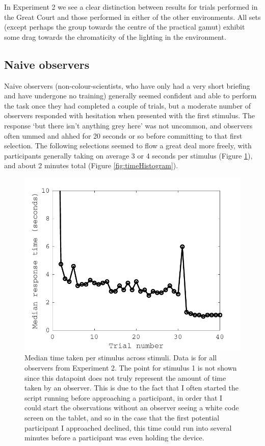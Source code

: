 In Experiment 2 we see a clear distinction between results for trials performed in the Great Court and those performed in either of the other environments. All sets (except perhaps the group towards the centre of the practical gamut) exhibit some drag towards the chromaticity of the lighting in the environment.

\subsection{Naive observers} \label{sec:naive}

Naive observers (non-colour-scientists, who have only had a very short briefing and have undergone no training) generally seemed confident and able to perform the task once they had completed a couple of trials, but a moderate number of observers responded with hesitation when presented with the first stimulus. The response `but there isn't anything grey here' was not uncommon, and observers often ummed and ahhed for 20 seconds or so before committing to that first selection. The following selections seemed to flow a great deal more freely, with participants generally taking on average 3 or 4 seconds per stimulus (Figure \ref{fig:mediantime}), and about 2 minutes total (Figure \ref{fig:timeHistogram}).

\begin{figure}[hbtp]
\includegraphics[max width=\textwidth]{figs/tablet/mediantime.pdf} 
\caption{Median time taken per stimulus across stimuli. Data is for all observers from Experiment 2. The point for stimulus 1 is not shown since this datapoint does not truly represent the amount of time taken by an observer. This is due to the fact that I often started the script running before approaching a participant, in order that I could start the observations without an observer seeing a white code screen on the tablet, and so in the case that the first potential participant I approached declined, this time could run into several minutes before a participant was even holding the device.}
\label{fig:mediantime}
\end{figure}

